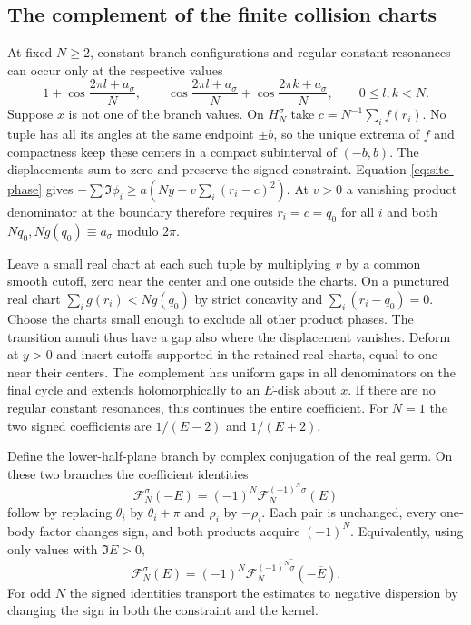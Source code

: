 \documentclass[11pt]{article}
\numberwithin{equation}{section}
\theoremstyle{definition}
\begin{document}
\subsection{The complement of the finite collision charts}\label{sec:finite-shift}

At fixed $N\ge2$, constant branch configurations and regular constant
resonances can occur only at the respective values
\begin{equation}\label{iso:new:exceptions}
 1+\cos\frac{2\pi l+a_\sigma}{N},\qquad
 \cos\frac{2\pi l+a_\sigma}{N}+
 \cos\frac{2\pi k+a_\sigma}{N},\qquad 0\le l,k<N .
\end{equation}
Suppose $x$ is not one of the branch values. On $H_N^\sigma$ take
$c=N^{-1}\sum_i f(r_i)$. No tuple has all its angles at the same
endpoint $\pm b$, so the unique extrema of $f$ and compactness
keep these centers in a compact subinterval of $(-b,b)$. The
displacements sum to zero and preserve the signed constraint.
Equation \eqref{eq:site-phase} gives
$-\sum\Im\phi_i\ge a(Ny+v\sum_i(r_i-c)^2)$. At $v>0$ a vanishing
product denominator at the boundary therefore requires
$r_i=c=q_0$ for all $i$ and both $Nq_0,Ng(q_0)\equiv a_\sigma$
modulo $2\pi$.

Leave a small real chart at each such tuple by multiplying $v$ by
a common smooth cutoff, zero near the center and one outside the
charts. On a punctured real chart $\sum_i g(r_i)<Ng(q_0)$ by
strict concavity and $\sum_i(r_i-q_0)=0$. Choose the charts small
enough to exclude all other product phases. The transition annuli
thus have a gap also where the displacement vanishes. Deform at
$y>0$ and insert cutoffs supported in the retained real charts,
equal to one near their centers. The complement has uniform gaps
in all denominators on the final cycle and extends holomorphically
to an $E$-disk about $x$. If there are no regular constant resonances,
this continues the entire coefficient. For $N=1$ the two signed
coefficients are $1/(E-2)$ and $1/(E+2)$.

Define the lower-half-plane branch by complex conjugation of the
real germ. On these two branches the coefficient identities
\[
 \mathcal F_N^\sigma(-E)=(-1)^N
                         \mathcal F_N^{(-1)^N\sigma}(E)
\]
follow by replacing $\theta_i$ by $\theta_i+\pi$ and $\rho_i$ by
$-\rho_i$. Each pair is unchanged, every one-body factor
changes sign, and both products acquire $(-1)^N$.
Equivalently, using only values with $\Im E>0$,
\begin{equation}\label{eq:iso-reflection}
 \mathcal F_N^\sigma(E)=(-1)^N
 \overline{\mathcal F_N^{(-1)^N\sigma}(-\overline E)}.
\end{equation}
For odd $N$ the signed identities transport the estimates to negative
dispersion by changing the sign in both the constraint and the kernel.
\end{document}
